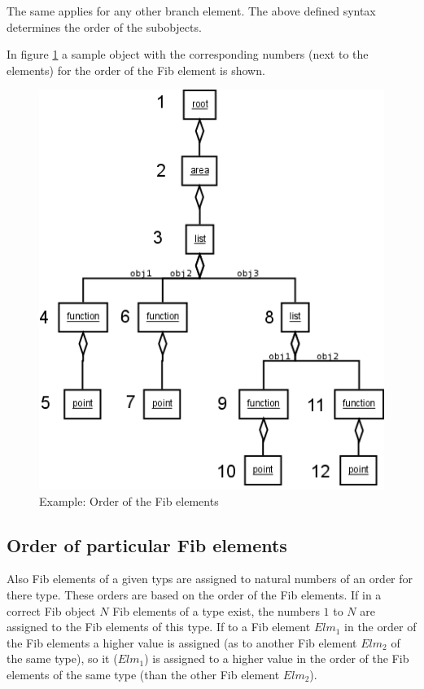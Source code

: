 The same applies for any other branch element. The above defined syntax determines the order of the subobjects.

In figure \ref{figOrderFibElements} a sample object with the corresponding numbers (next to the elements) for the order of the Fib element is shown.

\begin{figure}[htbp]
\begin{center}
  \includegraphics[scale=0.5]{order_elements}
\end{center}
\caption{Example: Order of the Fib elements}
\label{figOrderFibElements}
\end{figure}


\subsection{Order of particular Fib elements}

Also Fib elements of a given typs are assigned to natural numbers of an order for there type. These orders are based on the order of the Fib elements. If in a correct Fib object $N$ Fib elements of a type exist, the numbers $1$ to $N$ are assigned to the Fib elements of this type. If to a Fib element $Elm_1$ in the order of the Fib elements a higher value is assigned (as to another Fib element $Elm_2$ of the same type), so it ($Elm_1$) is assigned to a higher value in the order of the Fib elements of the same type (than the other Fib element $Elm_2$).

